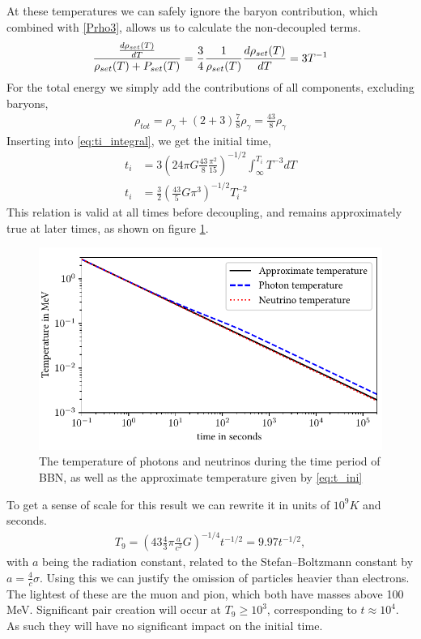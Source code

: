 At these temperatures we can safely ignore the baryon contribution, which combined with \eqref{Prho3}, allows us to calculate the non-decoupled terms.
\begin{align}
    \frac{\frac{d\rho_{set}(T)}{dT}}{\rho_{set}(T) + P_{set}(T)}=\frac{3}{4}\frac{1}{\rho_{set}(T)}\frac{d\rho_{set}(T)}{dT}=3T^{-1}
\end{align}
For the total energy we simply add the contributions of all components, excluding baryons,
\begin{align}
    \rho_{tot}=\rho_\gamma+(2+3)\frac{7}{8}\rho_\gamma=\frac{43}{8}\rho_\gamma
\end{align}
Inserting into \eqref{eq:ti_integral}, we get the initial time,
\begin{align}
    t_i&=3(24\pi G\frac{43}{8}\frac{\pi^2}{15})^{-1/2}\int_{\infty}^{T_i}T^{-3}dT\\
    t_i&=\frac{3}{2}( \frac{43}{5}G\pi^3)^{-1/2}T_i^{-2}
    \label{eq:t_ini}
\end{align}
This relation is valid at all times before decoupling, and remains approximately true at later times, as shown on figure \ref{fig:Temperature}.
\begin{figure}[h]
    \includegraphics[width=5.1in]{figures/Temperature.pdf}
    \caption{The temperature of photons and neutrinos during the time period of BBN, as well as the approximate temperature given by \ref{eq:t_ini}}
    \label{fig:Temperature}
\end{figure}

To get a sense of scale for this result we can rewrite it in units of $10^9K$ and seconds.
\begin{align}
    T_9=( 43 \frac{4}{3}\pi\frac{a}{c^2}G)^{-1/4}t^{-1/2}=9.97t^{-1/2},
    \label{eq:T9_ini}
\end{align}
with $a$ being the radiation constant, related to the Stefan–Boltzmann constant by $a=\frac{4}{c}\sigma$. 
Using this we can justify the omission of particles heavier than electrons. The lightest of these are the muon and pion, which both have masses above 100 MeV. Significant pair creation will occur at $T_9 \geq 10^3$, corresponding to $t\approx10^4$. As such they will have no significant impact on the initial time. 


